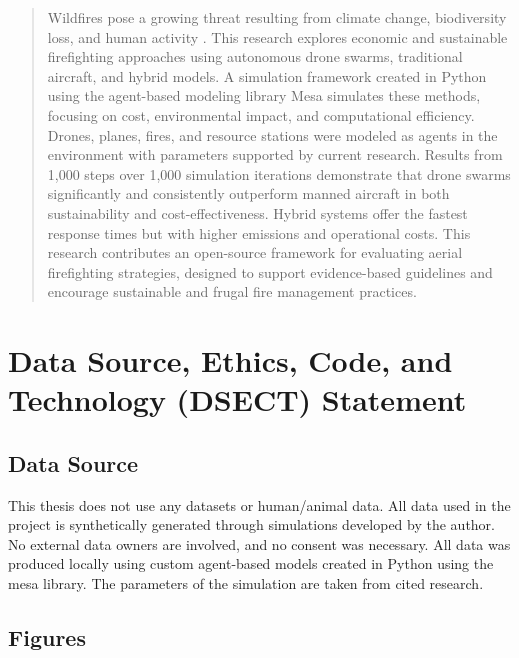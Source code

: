 \documentclass[11pt, a4paper]{article}
\begin{document}



\setcounter{page}{1}

\begin{abstract}
Wildfires pose a growing threat resulting from climate change, biodiversity loss, and human activity \citep{copernicus-wildfires}. This research explores economic and sustainable firefighting approaches using autonomous drone swarms, traditional aircraft, and hybrid models. A simulation framework created in Python using the agent-based modeling library Mesa \citep{terMesa} simulates these methods, focusing on cost, environmental impact, and computational efficiency. Drones, planes, fires, and resource stations were modeled as agents in the environment with parameters supported by current research. Results from 1,000 steps over 1,000 simulation iterations demonstrate that drone swarms significantly and consistently outperform manned aircraft in both sustainability and cost-effectiveness. Hybrid systems offer the fastest response times but with higher emissions and operational costs. This research contributes an open-source framework for evaluating aerial firefighting strategies, designed to support evidence-based guidelines and encourage sustainable and frugal fire management practices.
\end{abstract}




\section{Data Source, Ethics, Code, and Technology (DSECT) Statement}
\label{sec:CodeOfCondunt}

\subsection{Data Source}

This thesis does not use any datasets or human/animal data. All data used in the project is synthetically generated through simulations developed by the author. No external data owners are involved, and no consent was necessary. All data was produced locally using custom agent-based models created in Python using the mesa library. The parameters of the simulation are taken from cited research.

\subsection{Figures}
\end{document}
